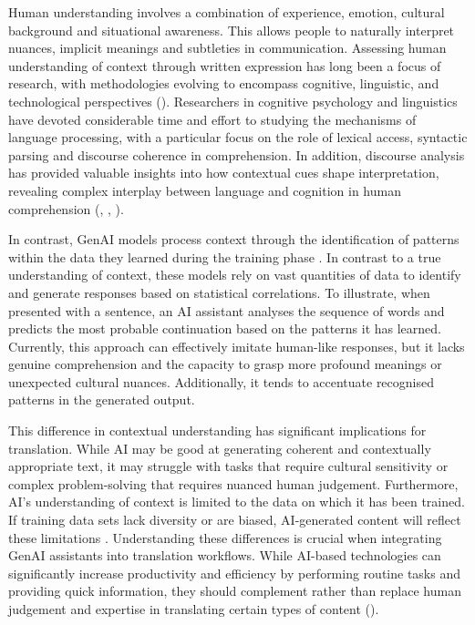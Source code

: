 \documentclass[output=paper]{langscibook}
\begin{document}
Human understanding involves a combination of experience, emotion, cultural background and situational awareness. This allows people to naturally interpret nuances, implicit meanings and subtleties in communication. Assessing human understanding of context through written expression has long been a focus of research, with methodologies evolving to encompass cognitive, linguistic, and technological perspectives (\citealt{obrien_human-centered_2024}). Researchers in cognitive psychology and linguistics have devoted considerable time and effort to studying the mechanisms of language processing, with a particular focus on the role of lexical access, syntactic parsing and discourse coherence in comprehension. In addition, discourse analysis has provided valuable insights into how contextual cues shape interpretation, revealing complex interplay between language and cognition in human comprehension (\citealt{vandijk06}, \citealt{pleyerw15}, \citealt{gledhill18}).

In contrast, GenAI models process context through the identification of patterns within the data they learned during the training phase \citep{zhuang2024staticbenchmarksadaptivetesting}. In contrast to a true understanding of context, these models rely on vast quantities of data to identify and generate responses based on statistical correlations. To illustrate, when presented with a sentence, an AI assistant analyses the sequence of words and predicts the most probable continuation based on the patterns it has learned. Currently, this approach can effectively imitate human-like responses, but it lacks genuine comprehension and the capacity to grasp more profound meanings or unexpected cultural nuances. Additionally, it tends to accentuate recognised patterns in the generated output.

This difference in contextual understanding has significant implications for translation. While AI may be good at generating coherent and contextually appropriate text, it may struggle with tasks that require cultural sensitivity or complex problem-solving that requires nuanced human judgement. Furthermore, AI’s understanding of context is limited to the data on which it has been trained. If training data sets lack diversity or are biased, AI-generated content will reflect these limitations \citep{martínez2023understandinginterplaygenerativeartificial}. Understanding these differences is crucial when integrating GenAI assistants into translation workflows. While AI-based technologies can significantly increase productivity and efficiency by performing routine tasks and providing quick information, they should complement rather than replace human judgement and expertise in translating certain types of content (\citealt{denning2022}).
\end{document}

